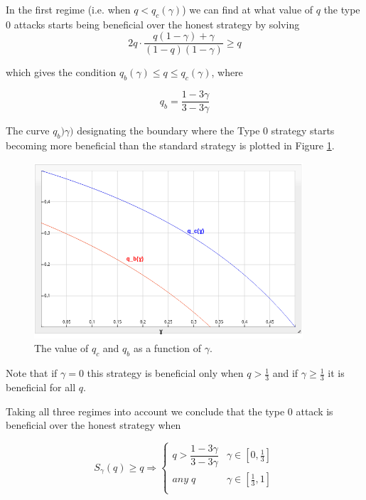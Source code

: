 \documentclass[letterpaper,12pt]{report}
\theoremstyle{plain}
\theoremstyle{definition}
\begin{document}
In the first regime (i.e. when $q<q_c(\gamma)$) we can find at what value of $q$ the type 0 attacks starts being beneficial over the honest strategy by solving
\begin{equation}\label{eqn:type0benefitonhonestequation}
2q\cdot\frac{q(1-\gamma)+\gamma}{(1-q)(1-\gamma)}\geq q
\end{equation}

which gives the condition $q_b(\gamma)\leq q \leq q_c(\gamma)$, where 

\begin{equation}\label{eqn:qb}
q_b= \dfrac{1-3\gamma}{3-3\gamma}
\end{equation}

The curve $q_b)\gamma)$ designating the boundary where the Type 0 strategy starts becoming more beneficial than the standard strategy is plotted in Figure \ref{fig:qbenefit}.

\begin{figure}[qcrit]
\centering
\includegraphics[width=100mm]{qcqb.png}
\caption{The value of $q_c$ and $q_b$ as a function of $\gamma$.}
\label{fig:qbenefit}
\end{figure}

Note that if $\gamma=0$ this strategy is beneficial only when $q>\frac{1}{3}$ and if $\gamma\geq\frac{1}{3}$ it is beneficial for all $q$.

\newpage

Taking all three regimes into account we conclude that the type 0 attack is beneficial over the honest strategy when

\begin{equation}\label{eqn:0overhonest}
S_{\gamma}(q)\geq q \Longrightarrow
\begin{cases}
q>\dfrac{1-3\gamma}{3-3\gamma} & \gamma\in [0,\frac{1}{3}] \\ 
\mathit{any\;} q & \gamma\in [\frac{1}{3},1] \\ 
\end{cases}
\end{equation}
\end{document}
